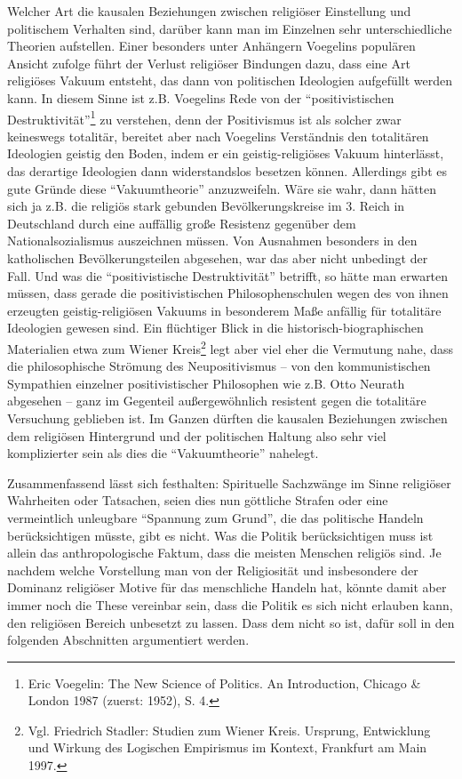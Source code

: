 Welcher Art die kausalen Beziehungen zwischen religiöser Einstellung und
politischem Verhalten sind, darüber kann man im Einzelnen sehr
unterschiedliche Theorien aufstellen. Einer besonders unter Anhängern
Voegelins populären Ansicht zufolge führt der Verlust religiöser Bindungen
dazu, dass eine Art religiöses Vakuum entsteht, das dann von politischen
Ideologien aufgefüllt werden kann. In diesem Sinne ist z.B. Voegelins Rede von
der "`positivistischen Destruktivität"'\footnote{Eric Voegelin: The New
  Science of Politics. An Introduction, Chicago \& London 1987 (zuerst: 1952),
  S. 4.} zu verstehen, denn der Positivismus ist als solcher zwar keineswegs
totalitär, bereitet aber nach Voegelins Verständnis den totalitären Ideologien
geistig den Boden, indem er ein geistig-religiöses Vakuum hinterlässt, das
derartige Ideologien dann widerstandslos besetzen können. Allerdings gibt es
gute Gründe diese "`Vakuumtheorie"' anzuzweifeln. Wäre sie wahr, dann hätten
sich ja z.B. die religiös stark gebunden Bevölkerungskreise im 3. Reich in
Deutschland durch eine auffällig große Resistenz gegenüber dem
Nationalsozialismus auszeichnen müssen. Von Ausnahmen besonders in den
katholischen Bevölkerungsteilen abgesehen, war das aber nicht unbedingt der
Fall. Und was die "`positivistische Destruktivität"' betrifft, so hätte man
erwarten müssen, dass gerade die positivistischen Philosophenschulen wegen des
von ihnen erzeugten geistig-religiösen Vakuums in besonderem Maße anfällig für
totalitäre Ideologien gewesen sind. Ein flüchtiger Blick in die
historisch-biographischen Materialien etwa zum Wiener Kreis\footnote{Vgl.
  Friedrich Stadler: Studien zum Wiener Kreis. Ursprung, Entwicklung und
  Wirkung des Logischen Empirismus im Kontext, Frankfurt am Main 1997.} legt
aber viel eher die Vermutung nahe, dass die philosophische Strömung des
Neupositivismus -- von den kommunistischen Sympathien einzelner
positivistischer Philosophen wie z.B.  Otto Neurath abgesehen -- ganz im
Gegenteil außergewöhnlich resistent gegen die totalitäre Versuchung geblieben
ist. Im Ganzen dürften die kausalen Beziehungen zwischen dem religiösen
Hintergrund und der politischen Haltung also sehr viel komplizierter sein als
dies die "`Vakuumtheorie"' nahelegt.

Zusammenfassend lässt sich festhalten: Spirituelle Sachzwänge im Sinne
religiöser Wahrheiten oder Tatsachen, seien dies nun göttliche Strafen oder
eine vermeintlich unleugbare "`Spannung zum Grund"', die das politische
Handeln berücksichtigen müsste, gibt es nicht. Was die Politik berücksichtigen
muss ist allein das anthropologische Faktum, dass die
meisten Menschen religiös sind. Je nachdem welche Vorstellung man von der
Religiosität und insbesondere der Dominanz religiöser Motive für das
menschliche Handeln hat, könnte damit aber immer noch die These vereinbar
sein, dass die Politik es sich nicht erlauben kann, den religiösen Bereich
unbesetzt zu lassen. Dass dem nicht so ist, dafür soll in den folgenden
Abschnitten argumentiert werden.

